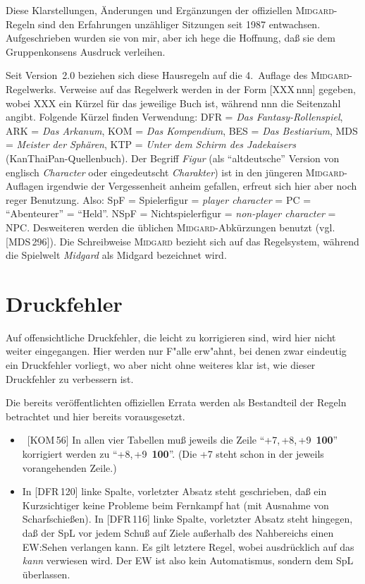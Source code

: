 \documentclass[10pt,a4paper,germanpar]{article}
\begin{document}
Diese Klarstellungen, Änderungen und Ergänzungen der offiziellen
\textsc{Midgard}-Regeln sind den Erfahrungen un\-zäh\-liger Sitzungen
seit 1987 entwachsen. Aufgeschrieben wurden sie von mir, aber ich hege die
Hoffnung, daß sie dem Gruppenkonsens Ausdruck verleihen.

Seit Version~2.0 beziehen sich diese Hausregeln auf die 4.~Auflage des
\textsc{Midgard}-Regelwerks. Verweise auf das Regelwerk werden in der Form
[XXX\,nnn] gegeben, wobei XXX ein Kürzel für das jeweilige Buch ist,
während nnn die Seitenzahl angibt. Folgende Kürzel finden Verwendung:
DFR = \emph{Das Fantasy-Rollenspiel}, ARK = \emph{Das Arkanum}, KOM =
\emph{Das Kompendium}, BES = \emph{Das Bestiarium}, MDS =
\emph{Meister der Sphären}, KTP = \emph{Unter dem Schirm des
  Jadekaisers} (KanThaiPan-Quellenbuch). Der Begriff \emph{Figur} (als
"`altdeutsche"' Version von englisch \emph{Character} oder
eingedeutscht \emph{Charakter}) ist in den jüngeren
\textsc{Midgard}-Auflagen irgendwie der Vergessenheit anheim gefallen,
erfreut sich hier aber noch reger Benutzung. Also: SpF = Spielerfigur
= \emph{player character} = PC = "`Abenteurer"' = "`Held"'. NSpF =
Nichtspielerfigur = \emph{non-player character} = NPC. Desweiteren
werden die üblichen \textsc{Midgard}-Abkürzungen benutzt
(vgl. [MDS\,296]). Die Schreibweise \textsc{Midgard} bezieht sich auf
das Regelsystem, während die Spielwelt \emph{Midgard} als Midgard
bezeichnet wird.

\section{Druckfehler}

Auf offensichtliche Druckfehler, die leicht zu korrigieren sind, wird
hier nicht weiter eingegangen. Hier werden nur F"alle erw"ahnt, bei
denen zwar eindeutig ein Druckfehler vorliegt, wo aber nicht ohne
weiteres klar ist, wie dieser Druckfehler zu verbessern ist.

Die bereits veröffentlichten offiziellen Errata werden als Bestandteil
der Regeln betrachtet und hier bereits vorausgesetzt.

\begin{itemize}
\item\ [KOM\,56] In allen vier Tabellen muß jeweils die Zeile
  "`+7,\,+8,\,+9~\textbf{100}"' korrigiert werden zu
  "`+8,\,+9~\textbf{100}"'. (Die +7 steht schon in der jeweils
  vorangehenden Zeile.) 
\item In [DFR\,120] linke Spalte, vorletzter Absatz steht geschrieben,
  daß ein Kurzsichtiger keine Probleme beim Fernkampf hat (mit
  Ausnahme von Scharfschießen). In [DFR\,116] linke Spalte, vorletzter
  Absatz steht hingegen, daß der SpL vor jedem Schuß auf Ziele
  außerhalb des Nahbereichs einen EW:Sehen verlangen kann. Es gilt
  letztere Regel, wobei ausdrücklich auf das \emph{kann} verwiesen
  wird. Der EW ist also kein Automatismus, sondern dem SpL überlassen.
\end{itemize}
\end{document}
